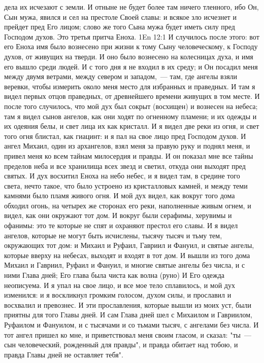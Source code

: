 дела их исчезают с земли.
И отныне не будет более там ничего тленного, ибо Он, Сын мужа, явился
и сел на престоле Своей славы: и всякое зло исчезнет и прейдет пред Его лицом;
слово же того Сына мужа будет иметь силу пред Господом духов.
Это третья притча Еноха.
\vs 1En 12:1
И случилось после этого: вот его Еноха имя было вознесено при
жизни к тому Сыну человеческому, к Господу духов, от живущих на тверди.
И оно было вознесено на колесницах духа, и имя его вышло среди людей.
И с того дня я не входил в их среду; и Он посадил меня между двумя
ветрами, между севером и западом,~--- там, где ангелы взяли веревки, чтобы
измерить около меня место для избранных и праведных.
И там я видел первых отцов праведных, от древнейшего времени живущих в
том месте.
И после того случилось, что мой дух был сокрыт (восхищен) и
вознесен на небеса; там я видел сынов ангелов, как они ходят по огненному
пламени; и их одежды и их одеяния белы, и свет лица их как кристалл.
И я видел две реки из огня, и свет того огня блистал, как гиацинт: и я
пал на свое лицо пред Господом духов.
И ангел Михаил, один из архангелов, взял меня за правую руку и поднял
меня, и привел меня ко всем тайнам милосердия и правды.
И он показал мне все тайны пределов неба и все хранилища всех звезд и
светил, откуда они выходят пред святых.
И дух восхитил Еноха на небо небес, и я видел там, в средине того
света, нечто такое, что было устроено из кристалловых камней, и между теми
камнями было пламя живого огня.
И мой дух видел, как вокруг того дома обходил огонь, на четырех же
сторонах его реки, наполненные живым огнем, и видел, как они окружают тот дом.
И вокруг были серафимы, херувимы и офанимы: это те которые не спят и
охраняют престол его славы.
И я видел ангелов, которые не могут быть исчислены, тысячу тысяч и
тьму тем, окружающих тот дом: и Михаил и Руфаил, Гавриил и Фануил, и святые
ангелы, которые вверху на небесах, выходят и входят в тот дом.
И вышли из того дома Михаил и Гавриил, Руфаил и Фануил, и многие
святые ангелы без числа, и с ними Глава дней; Его глава была чиста как волна
(руно) И Его одежда неописуема.
И я упал на свое лицо, и все мое тело сплавилось, и мой дух изменился:
и я воскликнул громким голосом, духом силы, и прославил и восхвалил и
превознес.
И эти прославления, которые вышли из моих уст, были приятны для того
Главы дней.
И сам Глава дней шел с Михаилом и Гавриилом, Руфаилом и Фануилом, и с
тысячами и со тьмами тысяч, с ангелами без числа.
И тот ангел пришел ко мне, и приветствовал меня своим гласом, и
сказал: "ты~--- сын человеческий, рожденный для правды", и правда обитает над
тобою, и правда Главы дней не оставляет тебя".
